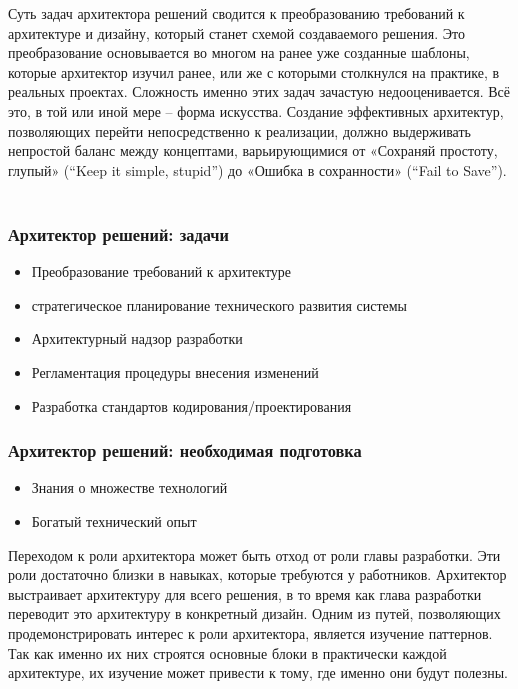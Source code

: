 \documentclass{../industrial-development}
\begin{document}
\lecturenotes

Суть задач архитектора решений сводится к преобразованию требований к архитектуре и дизайну, который станет схемой создаваемого решения. Это преобразование основывается во многом на ранее уже созданные шаблоны, которые архитектор изучил ранее, или же с которыми столкнулся на практике, в реальных проектах. 
Сложность именно этих задач зачастую недооценивается. Всё это, в той или иной мере – форма искусства. Создание эффективных архитектур, позволяющих перейти непосредственно к реализации, должно выдерживать непростой баланс между концептами, варьирующимися от «Сохраняй простоту, глупый» (“Keep it simple, stupid”) до «Ошибка в сохранности» (“Fail to Save”).
   ~\cite{Anatomy}

\begin{frame} \frametitle{Архитектор решений: задачи}
  \begin{itemize}
  \item Преобразование требований к архитектуре
  \item стратегическое планирование технического развития системы
  \item Архитектурный надзор разработки
  \item Регламентация процедуры внесения изменений
  \item Разработка стандартов кодирования/проектирования
  \end{itemize}
\end{frame}

\begin{frame} \frametitle{Архитектор решений: необходимая подготовка}
  \begin{itemize}
  \item Знания о множестве технологий
  \item Богатый технический опыт
  \end{itemize}
	\begin{block}{}
	\alert {} Переходом к роли {архитектора} может быть отход от роли главы разработки. Эти роли достаточно близки в навыках, которые требуются у работников. Архитектор выстраивает архитектуру для всего решения, в то время как глава разработки переводит это архитектуру в конкретный дизайн. 
	Одним из путей, позволяющих продемонстрировать интерес к роли архитектора, является изучение паттернов. Так как именно их них строятся основные блоки в практически каждой архитектуре, их изучение может привести к тому, где именно они будут полезны.
\end{block}
\end{frame}
\end{document}
